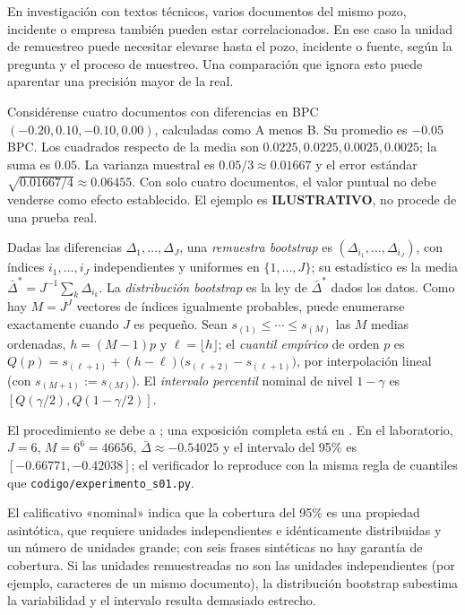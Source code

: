 En investigación con textos técnicos, varios documentos del mismo pozo,
incidente o empresa también pueden estar correlacionados. En ese caso la
unidad de remuestreo puede necesitar elevarse hasta el pozo, incidente o
fuente, según la pregunta y el proceso de muestreo. Una comparación que
ignora esto puede aparentar una precisión mayor de la real.

\begin{ejemplo}
Considérense cuatro documentos con diferencias en BPC
$(-0.20,0.10,-0.10,0.00)$, calculadas como A menos B.
Su promedio es $-0.05$ BPC. Los cuadrados respecto de la media son
$0.0225,0.0225,0.0025,0.0025$; la suma es $0.05$.
La varianza muestral es $0.05/3\approx0.01667$ y el error estándar
$\sqrt{0.01667/4}\approx0.06455$. Con solo cuatro documentos,
el valor puntual no debe venderse como efecto establecido. El ejemplo es
\textbf{ILUSTRATIVO}, no procede de una prueba real.
\end{ejemplo}

\begin{definicion}\label{s01:def:bootstrap}
Dadas las diferencias $\Delta_1,\ldots,\Delta_J$, una \emph{remuestra bootstrap}
es $(\Delta_{i_1},\ldots,\Delta_{i_J})$, con índices $i_1,\ldots,i_J$
independientes y uniformes en $\{1,\ldots,J\}$; su estadístico es la media
$\bar\Delta^*=J^{-1}\sum_k\Delta_{i_k}$. La \emph{distribución bootstrap} es la ley
de $\bar\Delta^*$ dados los datos. Como hay $M=J^J$ vectores de índices igualmente
probables, puede enumerarse exactamente cuando $J$ es pequeño. Sean
$s_{(1)}\le\cdots\le s_{(M)}$ las $M$ medias ordenadas, $h=(M-1)p$ y
$\ell=\lfloor h\rfloor$; el \emph{cuantil empírico} de orden $p$ es
$Q(p)=s_{(\ell+1)}+(h-\ell)\bigl(s_{(\ell+2)}-s_{(\ell+1)}\bigr)$, por interpolación
lineal (con $s_{(M+1)}:=s_{(M)}$). El \emph{intervalo percentil} nominal de nivel
$1-\gamma$ es $[Q(\gamma/2),Q(1-\gamma/2)]$.
\end{definicion}
\noindent El procedimiento se debe a \citet{efron1979}; una exposición completa está
en \citet{efron1993}. En el laboratorio, $J=6$, $M=6^6=46656$, $\bar\Delta\approx-0.54025$
y el intervalo del 95\% es $[-0.66771,-0.42038]$; el verificador lo reproduce con
la misma regla de cuantiles que \nolinkurl{codigo/experimento_s01.py}.
\begin{observacion}
El calificativo «nominal» indica que la cobertura del 95\% es una propiedad
asintótica, que requiere unidades independientes e idénticamente distribuidas y
un número de unidades grande; con seis frases sintéticas no hay garantía de
cobertura. Si las unidades remuestreadas no son las unidades independientes (por
ejemplo, caracteres de un mismo documento), la distribución bootstrap subestima la
variabilidad y el intervalo resulta demasiado estrecho.
\end{observacion}
